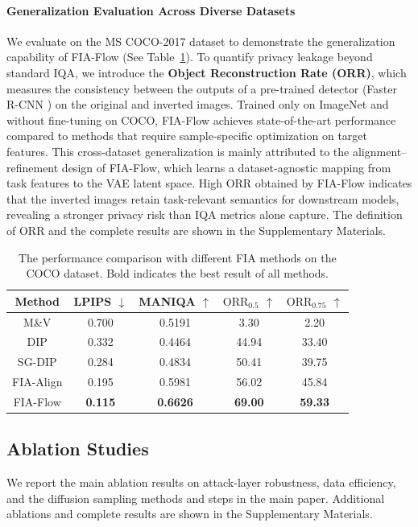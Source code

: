 \paragraph{Generalization Evaluation Across Diverse Datasets}
We evaluate on the MS COCO-2017 dataset \cite{lin2014microsoft} to demonstrate the generalization capability of FIA-Flow (See Table~\ref{table-coco}). 
To quantify privacy leakage beyond standard IQA, we introduce the \textbf{Object Reconstruction Rate (ORR)}, which measures the consistency between the outputs of a pre-trained detector (Faster R-CNN \cite{ren2016faster}) on the original and inverted images.
Trained only on ImageNet and without fine-tuning on COCO,  FIA-Flow achieves state-of-the-art performance compared to methods that require sample-specific optimization on target features.
This cross-dataset generalization is mainly attributed to the alignment–refinement design of FIA-Flow, which learns a dataset-agnostic mapping from task features to the VAE latent space.
High ORR obtained by FIA-Flow indicates that the inverted images retain task-relevant semantics for downstream models, revealing a stronger privacy risk than IQA metrics alone capture.
The definition of ORR and the complete results are shown in the Supplementary Materials. 
\begin{table}[t]
\setlength{\tabcolsep}{1.0mm}
\renewcommand\arraystretch{0.8}
\caption{The performance comparison with different FIA methods on the COCO dataset. Bold indicates the best result of all methods.}
\centering
\label{table-coco}
\begin{tabular}{ccccc}
\toprule
 Method & LPIPS $\downarrow$ &MANIQA $\uparrow$ & $\text{ORR}_{0.5}$ $\uparrow$& $\text{ORR}_{0.75}$ $\uparrow$\\
  \midrule
 M\&V &0.700&0.5191&3.30&2.20\\
  DIP &0.332 
&0.4464&44.94&33.40\\
   SG-DIP &0.284
&0.4834&50.41&39.75\\
   FIA-Align & 0.195
&0.5981&56.02&45.84\\
  \cellcolor{myhighlight}FIA-Flow &\cellcolor{myhighlight}\textbf{0.115}&\cellcolor{myhighlight}\textbf{0.6626}&\cellcolor{myhighlight}\textbf{69.00}&\cellcolor{myhighlight}\textbf{59.33}\\
\bottomrule
\end{tabular}
\end{table}


\subsection{Ablation Studies}
We report the main ablation results on attack-layer robustness, data efficiency, and the diffusion sampling methods and steps in the main paper. 
Additional ablations and complete results are shown in the Supplementary Materials.
